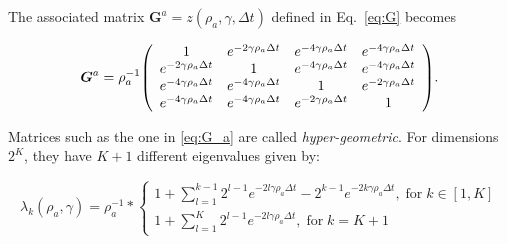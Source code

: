 \documentclass[preprint,amsmath,amssymb,superscriptaddress,showpacs,pre]{revtex4-1}
\let\originalleft\left
\let\originalright\right
\renewcommand{\left}{\mathopen{}\mathclose\bgroup\originalleft}
\renewcommand{\right}{\aftergroup\egroup\originalright}
\begin{document}
The associated matrix $\bm G^a=z(\rho_a,\gamma,\Delta t)$  defined in Eq.~\eqref{eq:G} becomes

\begin{equation} 
\bm G^a =  \rho_a^{-1}\left(
\begin{array}{cccc}
1 & e ^{-2\gamma\rho_a\Delta t} & e ^{-4\gamma\rho_a\Delta t}& {e ^{-4\gamma\rho_a\Delta t}} \\
e ^{-2\gamma\rho_a\Delta t} & 1 & e ^{-4\gamma\rho_a\Delta t} & e ^{-4\gamma\rho_a\Delta t} \\
e ^{-4\gamma\rho_a\Delta t} & e ^{-4\gamma\rho_a\Delta t}& 1 & e ^{-2\gamma\rho_a\Delta t}\\
e ^{-4\gamma\rho_a\Delta t} & e ^{-4\gamma\rho_a\Delta t} & e ^{-2\gamma\rho_a\Delta t} & 1 \\
\end{array}\label{eq:G_a}
\right).
\end{equation}

Matrices such as the one in \eqref{eq:G_a} are called \emph{hyper-geometric}.
For dimensions $2^K$, they have $K+1$ different eigenvalues given by: 

\begin{equation}
\label{eq:lambda_hyper}
\lambda_k(\rho_a,\gamma) =\rho^{-1}_a *
\begin{cases}
 1+\sum_{l=1}^{k-1} 2^{l-1} e ^{-2l\gamma\rho_a\Delta t}-2^{k-1} e ^{-2k\gamma\rho_a\Delta t}, \;\text{for}\; k\in[1,K] \\
 1+\sum_{l=1}^{K} 2^{l-1} e ^{-2l\gamma\rho_a\Delta t}, \;\text{for}\; k=K+1
\end{cases}
\end{equation}
\end{document}
